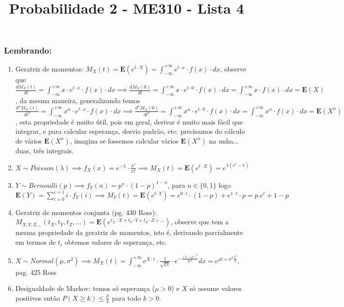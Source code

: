 \documentclass[portuguese]{article}
\begin{document}
\title{Probabilidade 2 - ME310 - Lista 4}

\maketitle

\subsubsection*{Lembrando:}
\begin{enumerate}
\item Geratriz de momentos: $M_{X}(t)=\mathbf{E}(e^{t\cdot X})=\int_{-\infty}^{+\infty}e^{t\cdot x}\cdot f(x)\cdot dx$,
observe que $\frac{dM_{X}(t)}{dt}=\int_{-\infty}^{+\infty}x\cdot e^{t\cdot x}\cdot f(x)\cdot dx\implies\frac{dM_{X}(0)}{dt}=\int_{-\infty}^{+\infty}x\cdot e^{t\cdot0}\cdot f(x)\cdot dx=\int_{-\infty}^{+\infty}x\cdot f(x)\cdot dx=\mathbf{E}(X)$,
da mesma maneira, generalizando temos $\frac{d^{n}M_{X}(t)}{dt^{n}}=\int_{-\infty}^{+\infty}x^{n}\cdot e^{t\cdot x}\cdot f(x)\cdot dx\implies\frac{d^{n}M_{X}(0)}{dt^{n}}=\int_{-\infty}^{+\infty}x^{n}\cdot e^{t\cdot0}\cdot f(x)\cdot dx=\int_{-\infty}^{+\infty}x^{n}\cdot f(x)\cdot dx=\mathbf{E}(X^{n})$,
esta propriedade é muito útil, pois em geral, derivar é muito mais
fácil que integrar, e para calcular esperança, desvio padrão, etc.
precisamos do cálculo de vários $\mathbf{E}(X^{n})$, imagina se fossemos
calcular vários $\mathbf{E}(X^{n})$ na unha... duas, três integrais.
\item $X\sim Poisson(\lambda)\implies f_{X}(x)=e^{-\lambda}\cdot\frac{\lambda^{x}}{x!}\implies M_{X}(t)=\mathbf{E}(e^{t\cdot X})=e^{\lambda(e^{t}-1)}$
\item $Y\sim Bernoulli(p)\implies f_{Y}(n)=p^{n}\cdot(1-p)^{1-n}$, para
$n\in\{0,1\}$ logo $\mathbf{E}(Y)=\sum_{i=0}^{i=1}i\cdot f_{Y}(i)\implies M_{Y}(t)=\mathbf{E}(e^{t\cdot Y})=e^{0\cdot t}\cdot(1-p)+e^{1\cdot t}\cdot p=p.e^{t}+1-p$
\item Geratriz de momentos conjunta (pg. 430 Ross): $M_{X,Y,Z....}(t_{X},t_{Y},t_{Z},...)=\mathbf{E}(e^{t_{X}\cdot X+t_{Y}\cdot Y+t_{Z}\cdot Z+...})$,
observe que tem a mesma propriedade da geratriz de momentos, isto
é, derivando parcialmente em termos de $t_{i}$ obtemos valores de
esperança, etc.
\item $X\sim Normal(\mu,\sigma^{2})\implies M_{X}(t)=\int_{-\infty}^{+\infty}e^{X\cdot t}\cdot\frac{1}{\sqrt{2\pi}}\cdot e^{-\frac{(x-\mu)^{2}}{2\sigma^{2}}}dx=e^{\mu t+\sigma^{2}\frac{t^{2}}{2}}$,
pag. 425 Ross
\item Desigualdade de Markov: temos só esperança ($\mu>0$) e $X$ só assume
valores positivos então $P(X\geq k)\le\frac{\mu}{k}$ para todo $k>0$.


\end{enumerate}
\end{document}
